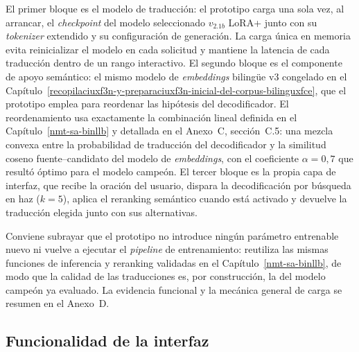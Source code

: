 \documentclass[12pt,a4paper,oneside]{book}
\begin{document}
\begin{figure}[htbp]
{%
}
\end{figure}

El primer bloque es el modelo de traducción: el prototipo carga una sola vez, al arrancar, el \emph{checkpoint} del modelo seleccionado \(v_{2.1b}\) LoRA+ junto con su \emph{tokenizer} extendido y su configuración de generación. La carga única en memoria evita reinicializar el modelo en cada solicitud y mantiene la latencia de cada traducción dentro de un rango interactivo. El segundo bloque es el componente de apoyo semántico: el mismo modelo de \emph{embeddings} bilingüe v3 congelado en el Capítulo~\ref{recopilaciuxf3n-y-preparaciuxf3n-inicial-del-corpus-bilinguxfce}, que el prototipo emplea para reordenar las hipótesis del decodificador. El reordenamiento usa exactamente la combinación lineal definida en el Capítulo~\ref{nmt-sa-binllb} y detallada en el Anexo~C, sección~C.5: una mezcla convexa entre la probabilidad de traducción del decodificador y la similitud coseno fuente--candidato del modelo de \emph{embeddings}, con el coeficiente \(\alpha=0{,}7\) que resultó óptimo para el modelo campeón. El tercer bloque es la propia capa de interfaz, que recibe la oración del usuario, dispara la decodificación por búsqueda en haz (\(k=5\)), aplica el reranking semántico cuando está activado y devuelve la traducción elegida junto con sus alternativas.

Conviene subrayar que el prototipo no introduce ningún parámetro entrenable nuevo ni vuelve a ejecutar el \emph{pipeline} de entrenamiento: reutiliza las mismas funciones de inferencia y reranking validadas en el Capítulo~\ref{nmt-sa-binllb}, de modo que la calidad de las traducciones es, por construcción, la del modelo campeón ya evaluado. La evidencia funcional y la mecánica general de carga se resumen en el Anexo~D.

\subsection{Funcionalidad de la interfaz}\label{prototipo-funcionalidad}
\end{document}
